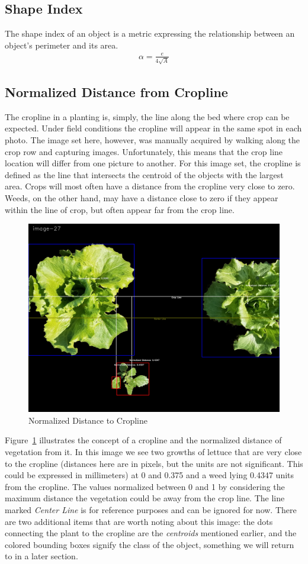 \documentclass[letterpaper]{article}
\begin{document}
{\subsection{Shape Index}
The shape index of an object is a metric expressing the relationship between an object's perimeter and its area.
\begin{eqnarray*}
\alpha = \frac {e} {4 \sqrt{A}}
\end{eqnarray*}

\subsection{Normalized Distance from Cropline}
The cropline in a planting is, simply, the line along the bed where crop can be expected. Under field conditions the cropline will appear in the same spot in each photo. The image set here, however, was manually acquired by walking along the crop row and capturing images.  Unfortunately, this means that the crop line location will differ from one picture to another. For this image set, the cropline is defined as the line that intersects the centroid of the objects with the largest area. Crops will most often have a distance from the cropline very close to zero. Weeds, on the other hand, may have a distance close to zero if they appear within the line of crop, but often appear far from the crop line.
\begin{figure}[h!]
	\centering
	\includegraphics[width=0.4\linewidth]{./figures/normalized-distance.jpg}
	\caption{Normalized Distance to Cropline}
	\label{fig:normalized-distance}
\end{figure}
Figure~\ref{fig:normalized-distance} illustrates the concept of a cropline and the normalized distance of vegetation from it. In this image we see two growths of lettuce that are very close to the cropline (distances here are in pixels, but the units are not significant. This could be expressed in millimeters) at 0 and 0.375 and a weed lying 0.4347 units from the cropline. The values normalized between 0 and 1 by considering the maximum distance the vegetation could be away from the crop line. The line marked {\it Center Line} is for reference purposes and can be ignored for now.  There are two additional items that are worth noting about this image: the dots connecting the plant to the cropline are the {\it centroids} mentioned earlier, and the colored bounding boxes signify the class of the object, something we will return to in a later section.

}
\end{document}
